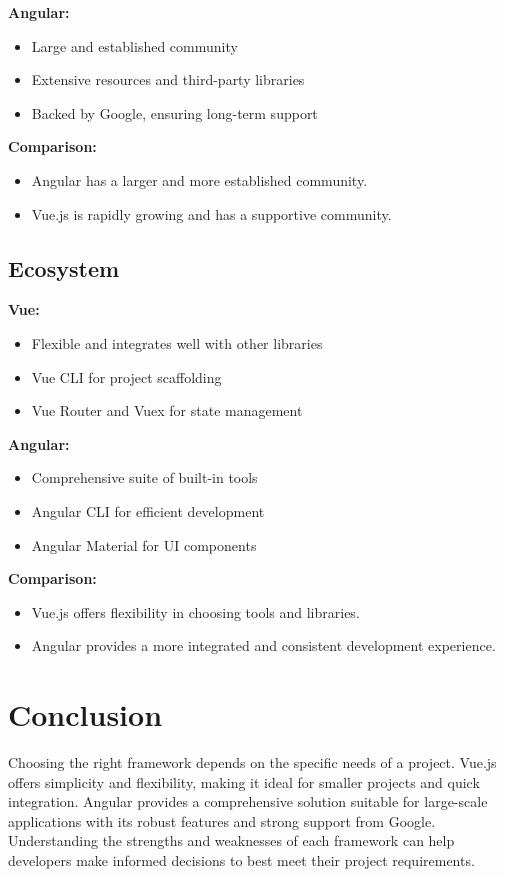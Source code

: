 \textbf{Angular:}
\begin{itemize}
    \item Large and established community
    \item Extensive resources and third-party libraries
    \item Backed by Google, ensuring long-term support
\end{itemize}

\textbf{Comparison:}
\begin{itemize}
    \item Angular has a larger and more established community.
    \item Vue.js is rapidly growing and has a supportive community.
\end{itemize}

\subsection{Ecosystem}

\textbf{Vue:}
\begin{itemize}
    \item Flexible and integrates well with other libraries
    \item Vue CLI for project scaffolding
    \item Vue Router and Vuex for state management
\end{itemize}

\textbf{Angular:}
\begin{itemize}
    \item Comprehensive suite of built-in tools
    \item Angular CLI for efficient development
    \item Angular Material for UI components
\end{itemize}

\textbf{Comparison:}
\begin{itemize}
    \item Vue.js offers flexibility in choosing tools and libraries.
    \item Angular provides a more integrated and consistent development experience.
\end{itemize}

\section{Conclusion}

Choosing the right framework depends on the specific needs of a project. Vue.js offers simplicity and flexibility, making it ideal for smaller projects and quick integration. Angular provides a comprehensive solution suitable for large-scale applications with its robust features and strong support from Google. Understanding the strengths and weaknesses of each framework can help developers make informed decisions to best meet their project requirements.
